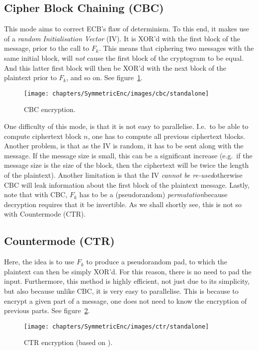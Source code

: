   \subsection{Cipher Block Chaining (CBC)}
  \label{sec:cbc_mode}
  This mode aims to correct ECB's flaw of determinism. To this end, it makes use of a \emph{random Initialisation Vector} (IV). It is XOR'd with the first block of the message, prior to the call to $F_k$. This means that ciphering two messages with the same initial block, will \emph{not} cause the first block of the cryptogram to be equal. And this latter first block will then be XOR'd with the next block of the plaintext prior to $F_k$, and so on. See figure~\ref{fig:cbc_mode}.
  \begin{figure}[h!]
    \centering
    \texttt{[image: chapters/SymmetricEnc/images/cbc/standalone]}
    \caption{CBC encryption.}
    \label{fig:cbc_mode}
  \end{figure}
  One difficulty of this mode, is that it is not easy to parallelise. I.e.\ to be able to compute ciphertext block $n$, one has to compute all previous ciphertext blocks. Another problem, is that as the IV is random, it has to be sent along with the message. If the message size is small, this can be a significant increase (e.g.\ if the message size is the size of the block, then the ciphertext will be twice the length of the plaintext). Another limitation is that the IV \emph{cannot be re-used}\emd otherwise CBC will leak information about the first block of the plaintext message. Lastly, note that with CBC, $F_k$ has to be a (pseudorandom) \emph{permutation}\emd because decryption requires that it be invertible. As we shall shortly see, this is not so with Countermode (CTR).

  \subsection{Countermode (CTR)}
  \label{sec:ctr_mode}
  Here, the idea is to use $F_k$ to produce a pseudorandom pad, to which the plaintext can then be simply XOR'd. For this reason, there is no need to pad the input. Furthermore, this method is highly efficient, not just due to its simplicity, but also because unlike CBC, it is very easy to parallelise. This is because to encrypt a given part of a message, one does not need to know the encryption of previous parts. See figure~\ref{fig:ctr_mode}.
  \begin{figure}[hb!]
    \centering
    \texttt{[image: chapters/SymmetricEnc/images/ctr/standalone]}
    \caption{CTR encryption (based on \cite{Maimut:CTR}).}
    \label{fig:ctr_mode}
  \end{figure}

